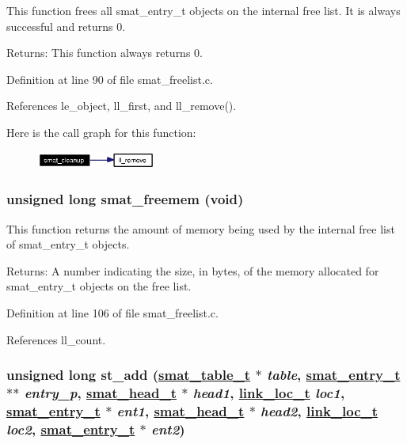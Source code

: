 This function frees all smat\_\-entry\_\-t objects on the internal free list. It is always successful and returns 0.

\begin{Desc}
\item[Returns:]This function always returns 0.\end{Desc}


Definition at line 90 of file smat\_\-freelist.c.

References le\_\-object, ll\_\-first, and ll\_\-remove().

Here is the call graph for this function:\begin{figure}[H]
\begin{center}
\leavevmode
\includegraphics[width=110pt]{group__dbprim__smat_ga8_cgraph}
\end{center}
\end{figure}
\hypertarget{group__dbprim__smat_ga9}{
\subsubsection[smat\_\-freemem]{\setlength{\rightskip}{0pt plus 5cm}unsigned long smat\_\-freemem (void)}}
\label{group__dbprim__smat_ga9}


This function returns the amount of memory being used by the internal free list of smat\_\-entry\_\-t objects.

\begin{Desc}
\item[Returns:]A number indicating the size, in bytes, of the memory allocated for smat\_\-entry\_\-t objects on the free list.\end{Desc}


Definition at line 106 of file smat\_\-freelist.c.

References ll\_\-count.\hypertarget{group__dbprim__smat_ga11}{
\subsubsection[st\_\-add]{\setlength{\rightskip}{0pt plus 5cm}unsigned long st\_\-add (\hyperlink{struct__smat__table__s}{smat\_\-table\_\-t} $\ast$ {\em table}, \hyperlink{struct__smat__entry__s}{smat\_\-entry\_\-t} $\ast$$\ast$ {\em entry\_\-p}, \hyperlink{struct__smat__head__s}{smat\_\-head\_\-t} $\ast$ {\em head1}, \hyperlink{group__dbprim__link_ga4}{link\_\-loc\_\-t} {\em loc1}, \hyperlink{struct__smat__entry__s}{smat\_\-entry\_\-t} $\ast$ {\em ent1}, \hyperlink{struct__smat__head__s}{smat\_\-head\_\-t} $\ast$ {\em head2}, \hyperlink{group__dbprim__link_ga4}{link\_\-loc\_\-t} {\em loc2}, \hyperlink{struct__smat__entry__s}{smat\_\-entry\_\-t} $\ast$ {\em ent2})}}
\label{group__dbprim__smat_ga11}


